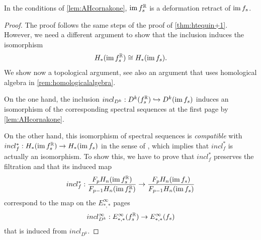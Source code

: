 \documentclass[a4paper,12pt]{amsart}
\begin{document}
\begin{theorem}\label{thm:htequip}
In the conditions of \cref{lem:AHcornakone}, $\operatorname{im} f_s^{\mathbb{R}}$ is a deformation retract of $\operatorname{im} f_s$.
\end{theorem}
\begin{proof}
The proof follows the same steps of the proof of \cref{thm:htequin+1}. However, we need a different argument to show that the inclusion induces the isomorphism
\[H_*(\operatorname{im} f_s^{\mathbb{R}})\cong H_*( \operatorname{im} f_s).\]
We show now a topological argument, see also an argument that uses homological algebra in \cref{rem:homologicalalgebra}.
\newline

On the one hand, the inclusion $incl_{D^k}:D^k(f_s^{\mathbb{R}})\hookrightarrow D^k(\operatorname{im} f_s)$ induces an isomorphism of the corresponding spectral sequences at the first page by \cref{lem:AHcornakone}. 

On the other hand, this isomorphism of spectral sequences is \textsl{compatible} with $incl_f^*:H_*(\operatorname{im} f_s^{\mathbb{R}})\rightarrow H_*(\operatorname{im} f_s)$ in the sense of \cite[Comparison Theorem 5.2.12]{Weibel1994}, which implies that $incl_f^*$ is actually an isomorphism. 
To show this, we have to prove that $incl_f^*$ preserves the filtration and that its induced map
\begin{equation}\label{eq:inclf}
incl_f^*: \frac{F_pH_n(\operatorname{im} f_s^{\mathbb{R}})}{F_{p-1}H_n(\operatorname{im} f_s^{\mathbb{R}})}\rightarrow \frac{F_pH_n(\operatorname{im} f_s)}{F_{p-1}H_n(\operatorname{im} f_s)} 
\end{equation}
correspond to the map on the $E^\infty_{*,*}$ pages
\begin{equation}\label{eq:incldk}
incl_{D^k}^\infty: E^\infty_{*,*}(f_s^{\mathbb{R}}) \rightarrow E^\infty_{*,*}(f_s) 
\end{equation}
that is induced from $incl_{D^k}$. 


\end{proof}
\end{document}
